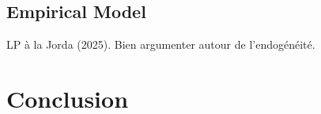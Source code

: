 \documentclass[11pt,english,a4paper, twoside, authoryear]{article}
\begin{document}
\subsection{Empirical Model}

LP à la Jorda (2025). Bien argumenter autour de l'endogénéité.

\section{Conclusion}



%



\clearpage

\setcounter{table}{0}
\renewcommand{\thefigure}{A.\arabic{figure}}
\renewcommand{\thetable}{A.\arabic{table}}



\appendix
\end{document}
